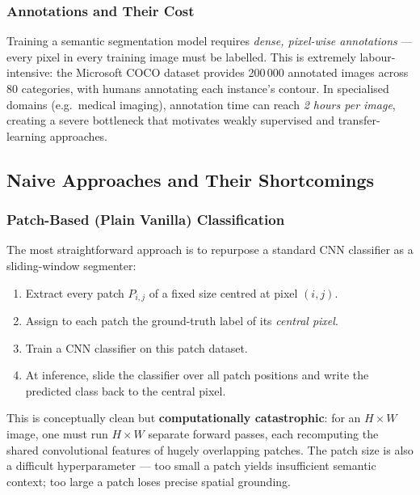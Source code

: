 \documentclass[11pt,a4paper]{article}
\begin{document}
\subsubsection{Annotations and Their Cost}

Training a semantic segmentation model requires \emph{dense, pixel-wise annotations} — every pixel in every training image must be labelled. This is extremely labour-intensive: the Microsoft COCO dataset provides 200\,000 annotated images across 80 categories, with humans annotating each instance's contour. In specialised domains (e.g.\ medical imaging), annotation time can reach \emph{2 hours per image}, creating a severe bottleneck that motivates weakly supervised and transfer-learning approaches.

\subsection{Naive Approaches and Their Shortcomings}
\label{sec:semseg_naive}

\subsubsection{Patch-Based (Plain Vanilla) Classification}

The most straightforward approach is to repurpose a standard CNN classifier as a sliding-window segmenter:

\begin{enumerate}
  \item Extract every patch $P_{i,j}$ of a fixed size centred at pixel $(i,j)$.
  \item Assign to each patch the ground-truth label of its \emph{central pixel}.
  \item Train a CNN classifier on this patch dataset.
  \item At inference, slide the classifier over all patch positions and write the predicted class back to the central pixel.
\end{enumerate}

This is conceptually clean but \textbf{computationally catastrophic}: for an $H\times W$ image, one must run $H\times W$ separate forward passes, each recomputing the shared convolutional features of hugely overlapping patches. The patch size is also a difficult hyperparameter — too small a patch yields insufficient semantic context; too large a patch loses precise spatial grounding.
\end{document}
